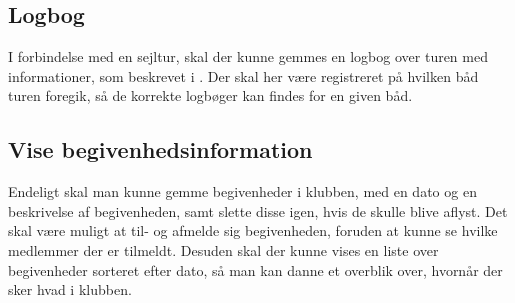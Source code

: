 \subsection{Logbog}

I forbindelse med en sejltur, skal der kunne gemmes en logbog over turen med informationer, som beskrevet i .
Der skal her være registreret på hvilken båd turen foregik, så de korrekte logbøger kan findes for en given båd.

\subsection{Vise begivenhedsinformation} 

Endeligt skal man kunne gemme begivenheder i klubben, med en dato og en beskrivelse af begivenheden, samt slette disse igen, hvis de skulle blive aflyst. 
Det skal være muligt at til- og afmelde sig begivenheden, foruden at kunne se hvilke medlemmer der er tilmeldt.
Desuden skal der kunne vises en liste over begivenheder sorteret efter dato, så man kan danne et overblik over, hvornår der sker hvad i klubben.

